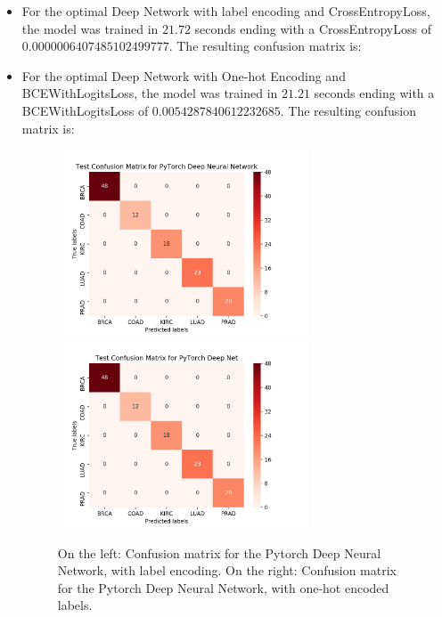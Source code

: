 \documentclass{article}
\begin{document}
\begin{itemize}
\item For the optimal Deep Network with label encoding and CrossEntropyLoss, the model was trained in $21.72$ seconds ending with a CrossEntropyLoss of $0.0000006407485102499777$. The resulting confusion matrix is:


\item For the optimal Deep Network with One-hot Encoding and BCEWithLogitsLoss, the model was trained in $21.21$ seconds ending with a BCEWithLogitsLoss of $0.0054287840612232685$. The resulting confusion matrix is:


\begin{figure}[hbt]
\centering
\advance\leftskip-4cm
\advance\rightskip-4cm
\includegraphics[width=0.7\textwidth]{img/matrix_py_enc}
\includegraphics[width=0.7\textwidth]{img/matrix_py_hot}
\caption{On the left: Confusion matrix for the Pytorch Deep Neural Network, with label encoding. On the right: Confusion matrix for the Pytorch Deep Neural Network, with one-hot encoded labels.}
\label{fig_torch}
\end{figure}


\end{itemize}
\end{document}
